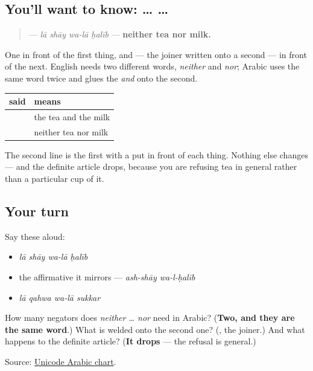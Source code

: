 \subsection*{You'll want to know:  …  …}
\begin{quote}
\textbf{   } — \emph{lā shāy wa-lā ḥalīb} — \textbf{neither tea nor milk.}
\end{quote}

One \textbf{} in front of the first thing, and \textbf{} — the joiner \textbf{} written onto a second \textbf{} — in front of the next. English needs two different words, \emph{neither} and \emph{nor}; Arabic uses the same word twice and glues the \emph{and} onto the second.

\begin{grammarlens}[title={Grammar Lens: the mirror of the joiner}]
\noindent
\begin{tabularx}{\linewidth}{@{}>{\raggedright\arraybackslash}X>{\raggedright\arraybackslash}X@{}}
\toprule
\textbf{said} & \textbf{means} \\
\midrule
\textbf{\ar{الشاي} \ar{والحليب}} & the tea and the milk \\
\textbf{\ar{لا} \ar{شاي} \ar{ولا} \ar{حليب}} & neither tea nor milk \\
\bottomrule
\end{tabularx}

The second line is the first with a \textbf{} put in front of each thing. Nothing else changes — and the definite article drops, because you are refusing tea in general rather than a particular cup of it.
\end{grammarlens}

\subsection*{Your turn}
Say these aloud:

\begin{itemize}
\raggedright
  \item \emph{lā shāy wa-lā ḥalīb}
  \item the affirmative it mirrors — \emph{ash-shāy wa-l-ḥalīb}
  \item \emph{lā qahwa wa-lā sukkar}
\end{itemize}

\begin{tcolorbox}[breakable,colback=teal!4,colframe=teal!35!black,title={Before you move on}]
How many negators does \emph{neither … nor} need in Arabic? (\textbf{Two, and they are the same word}.) What is welded onto the second one? (\textbf{}, the joiner.) And what happens to the definite article? (\textbf{It drops} — the refusal is general.)

Source: \href{https://www.unicode.org/charts/PDF/U0600.pdf}{Unicode Arabic chart}.
\end{tcolorbox}
